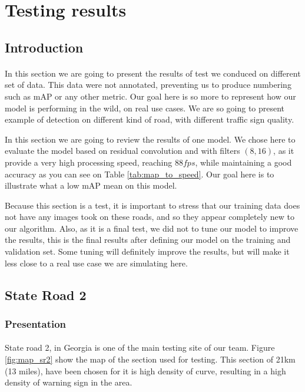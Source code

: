 \section{Testing results} \label{sec:test}
\subsection{Introduction}
\paragraph{}
In this section we are going to present the results of test we conduced on different set of data. This data were not annotated, preventing us to produce numbering such as mAP or any other metric. Our goal here is so more to represent how our model is performing in the wild, on real use cases. We are so going to present example of detection on different kind of road, with different traffic sign quality.

In this section we are going to review the results of one model. We chose here to evaluate the model based on residual convolution and with filters $(8,16)$, as it provide a very high processing speed, reaching $88fps$, while maintaining a good accuracy as you can see on Table \ref{tab:map_to_speed}. Our goal here is to illustrate what a low mAP mean on this model.

Because this section is a test, it is important to stress that our training data does not have any images took on these roads, and so they appear completely new to our algorithm. Also, as it is a final test, we did not to tune our model to improve the results, this is the final results after defining our model on the training and validation set. Some tuning will definitely improve the results, but will make it less close to a real use case we are simulating here.

\subsection{State Road 2} \label{sec:sr2}
\subsubsection{Presentation}
\paragraph{}
State road 2, in Georgia is one of the main testing site of our team. Figure \ref{fig:map_sr2} show the map of the section used for testing. This section of 21km (13 miles), have been chosen for it is high density of curve, resulting in a high density of warning sign in the area.

